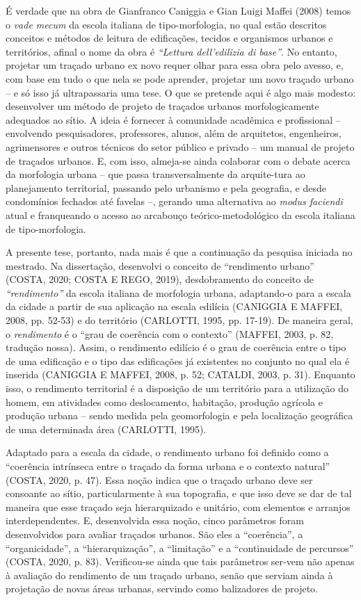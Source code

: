 \documentclass[twoside, 12pt, english,italian,latin,greek,french,spanish,brazil]{book}
\begin{document}
         É verdade que na obra de Gianfranco Caniggia e Gian Luigi Maffei (2008) temos o \textit{vade mecum} da escola italiana de tipo-morfologia, no qual estão descritos conceitos e métodos de leitura de edificações, tecidos e organismos urbanos e territórios, afinal o nome da obra é \textit{“Lettura dell’edilizia di base”}. No entanto, projetar um traçado urbano ex novo requer olhar para essa obra pelo avesso, e, com base em tudo o que nela se pode aprender, projetar um novo traçado urbano – e só isso já ultrapassaria uma tese. O que se pretende aqui é algo mais modesto: desenvolver um método de projeto de traçados urbanos morfologicamente adequados ao sítio. A ideia é fornecer à comunidade acadêmica e profissional – envolvendo pesquisadores, professores, alunos, além de arquitetos, engenheiros, agrimensores e outros técnicos do setor público e privado – um manual de projeto de traçados urbanos. E, com isso, almeja-se ainda colaborar com o debate acerca da morfologia urbana – que passa transversalmente da arquite-tura ao planejamento territorial, passando pelo urbanismo e pela geografia, e desde condomínios fechados até favelas –, gerando uma alternativa ao \textit{modus faciendi} atual e franqueando o acesso ao arcabouço teórico-metodológico da escola italiana de tipo-morfologia.

        A presente tese, portanto, nada mais é que a continuação da pesquisa iniciada no mestrado.  Na dissertação, desenvolvi o conceito de “rendimento urbano” (COSTA, 2020; COSTA E REGO, 2019), desdobramento do conceito de \textit{“rendimento”} da escola italiana de morfologia urbana,   adaptando-o para a escala da cidade a partir de sua aplicação na escala edilícia (CANIGGIA E MAFFEI, 2008, pp. 52-53) e do território (CARLOTTI, 1995, pp. 17-19). De maneira geral, o \textit{rendimento} é o “grau de coerência com o contexto” (MAFFEI, 2003, p. 82, tradução nossa). Assim, o rendimento edilício é o grau de coerência entre o tipo  de uma edificação e o tipo das edificações já existentes no conjunto no qual ela é inserida (CANIGGIA E MAFFEI, 2008, p. 52; CATALDI, 2003, p. 31). Enquanto isso, o rendimento territorial é a disposição de um território para a utilização do homem,  em atividades como deslocamento, habitação, produção agrícola e produção urbana – sendo medida pela geomorfologia e pela localização geográfica de uma determinada área  (CARLOTTI, 1995). 

        Adaptado para a escala da cidade, o rendimento urbano foi definido como a “coerência intrínseca entre o traçado da forma urbana e o contexto natural” (COSTA, 2020, p. 47). Essa noção indica que o traçado urbano deve ser consoante ao sítio, particularmente à sua topografia, e que isso deve se dar de tal maneira que esse traçado seja hierarquizado e unitário, com elementos e arranjos interdependentes. E, desenvolvida essa noção, cinco parâmetros foram desenvolvidos para avaliar traçados urbanos. São eles a “coerência”, a “organicidade”, a “hierarquização”, a “limitação” e a “continuidade de percursos” (COSTA, 2020, p. 83). Verificou-se ainda que tais parâmetros ser-vem não apenas à avaliação do rendimento de um traçado urbano, senão que serviam ainda à projetação de novas áreas urbanas, servindo como balizadores de projeto. 
\end{document}
